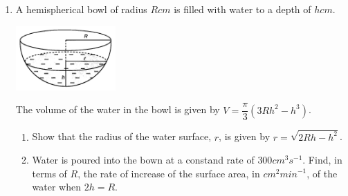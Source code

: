 \documentclass{report}
\begin{document}
\begin{multicols*}{2}
\begin{enumerate}
            \item A hemispherical bowl of radius $R\textit{cm}$ is filled with water to a depth
                  of $h\textit{cm}$.
                  \begin{center}
                        \includegraphics[width=0.3\textwidth]{./images/q33.jpeg}
                  \end{center}
                  The volume of the water in the bowl is given by $V = \dfrac{\pi}{3}(3Rh^2 - h^3)$.
                  \begin{enumerate}
                        \item Show that the radius of the water surface, $r$, is given by $r = \sqrt{2Rh -
                                          h^2}$.
                        \item Water is poured into the bown at a constand rate of
                              $300\textit{cm}^3\textit{s}^{-1}$. Find, in terms of $R$, the rate of increase
                              of the surface area, in $\textit{cm}^2 \textit{min}^{-1}$, of the water when
                              $2h = R$.
                  \end{enumerate}
      \end{enumerate}
\end{multicols*}
\end{document}
